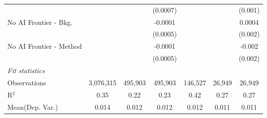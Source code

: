\begin{tabular}{lcccccc}
                           &               &               & (0.0007)      &              &          & (0.001)\\   
   No AI Frontier - Bkg.   &               &               & -0.0001       &              &          & 0.0004\\   
                           &               &               & (0.0005)      &              &          & (0.002)\\   
   No AI Frontier - Method &               &               & -0.0001       &              &          & -0.002\\   
                           &               &               & (0.0005)      &              &          & (0.002)\\   
   \midrule
   \emph{Fit statistics}\\
   Observations            & 3,076,315     & 495,903       & 495,903       & 146,527      & 26,949   & 26,949\\  
   R$^2$                   & 0.35          & 0.22          & 0.23          & 0.42         & 0.27     & 0.27\\  
Mean(Dep. Var.) & 0.014 & 0.012 & 0.012 & 0.012 & 0.011 & 0.011 \\
   

\end{tabular}

